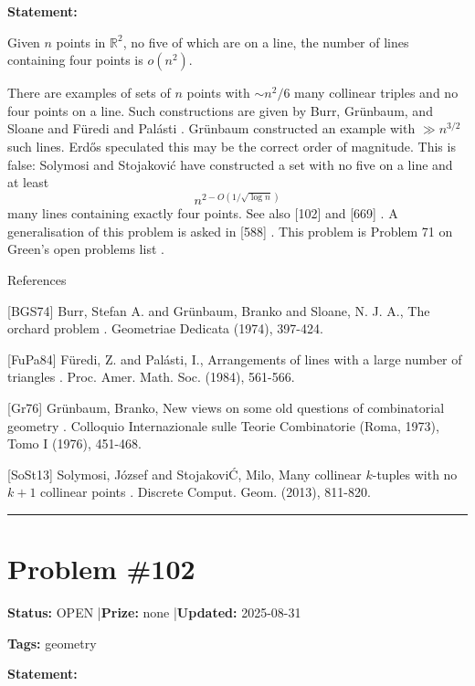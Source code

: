 \documentclass{article}
\begin{document}
\medskip

\noindent\textbf{Statement:}

Given $n$ points in $\mathbb{R}^2$, no five of which are on a line, the number of lines containing four points is $o(n^2)$.




There are examples of sets of $n$ points with $\sim n^2/6$ many collinear triples and no four points on a line. Such constructions are given by Burr, Gr\"{u}nbaum, and Sloane \cite{BGS74} and F\"{u}redi and Pal\'{a}sti \cite{FuPa84}. Gr\"{u}nbaum \cite{Gr76} constructed an example with $\gg n^{3/2}$ such lines. Erd\H{o}s speculated this may be the correct order of magnitude. This is false: Solymosi and Stojakovi\'{c} \cite{SoSt13} have constructed a set with no five on a line and at least\[n^{2-O(1/\sqrt{\log n})}\]many lines containing exactly four points. See also [102] and [669] . A generalisation of this problem is asked in [588] . This problem is Problem 71 on Green's open problems list .




References

[BGS74] Burr, Stefan A. and Gr\"{u}nbaum, Branko and Sloane, N. J. A., The orchard problem . Geometriae Dedicata (1974), 397-424.

[FuPa84] F\"{u}redi, Z. and Pal\'{a}sti, I., Arrangements of lines with a large number of triangles . Proc. Amer. Math. Soc. (1984), 561-566.

[Gr76] Gr\"{u}nbaum, Branko, New views on some old questions of combinatorial geometry . Colloquio Internazionale sulle Teorie Combinatorie (Roma, 1973), Tomo I (1976), 451-468.

[SoSt13] Solymosi, J\'{o}zsef and Stojakovi\'C, Milo\vS, Many collinear {$k$}-tuples with no {$k+1$} collinear points . Discrete Comput. Geom. (2013), 811-820.

\noindent\rule{\linewidth}{0.4pt}


\section{Problem \#102}
\label{prob:102}

\noindent\textbf{Status:} OPEN \quad|\quad \textbf{Prize:} none \quad|\quad \textbf{Updated:} 2025-08-31

\noindent\textbf{Tags:} geometry

\medskip

\noindent\textbf{Statement:}
\end{document}
